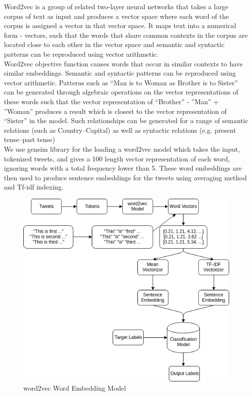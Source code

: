 \documentclass[a4paper,11pt]{article}
\begin{document}
Word2vec\cite{mikolov2013efficient} is a group of related two-layer neural networks that takes a large corpus of text as input and produces a vector space where each word of the corpus is assigned a vector in that vector space. It maps text into a numerical form - vectors, such that the words that share common contexts in the corpus are located close to each other in the vector space and semantic and syntactic patterns can be reproduced using vector arithmetic. 
\medskip\\
Word2vec objective function causes words that occur in similar contexts to have similar embeddings. Semantic and syntactic patterns can be reproduced using vector arithmetic. Patterns such as “Man is to Woman as Brother is to Sister” can be generated through algebraic operations on the vector representations of these words such that the vector representation of “Brother” - ”Man” + ”Woman” produces a result which is closest to the vector representation of “Sister” in the model. Such relationships can be generated for a range of semantic relations (such as Country–Capital) as well as syntactic relations (e.g. present tense–past tense)
\medskip\\
We use gensim library for the loading a word2vec model which takes the input, tokenized tweets, and  gives a 100 length vector representation of each word, ignoring words with a total frequency lower than 5. These word embeddings are then used to produce sentence embeddings for the tweets using averaging method and Tf-idf indexing\cite{mikolov2013distributed}.
\medskip\\
\begin{figure}[ht]
    \centering
    \includegraphics[width=11.5cm]{word2vec.png}
    \caption{word2vec Word Embedding Model}
    \label{fig:my_label}
\end{figure}
\end{document}
